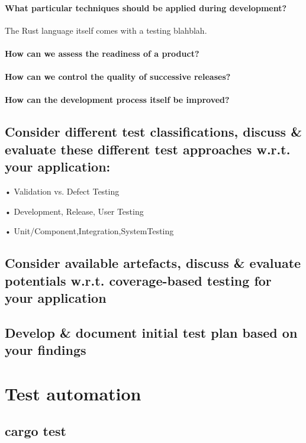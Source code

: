 \documentclass{scrartcl}
\begin{document}
\paragraph{What particular techniques should be applied during development?}
  
  The Rust language itself comes with a testing blahblah.
\paragraph{How can we assess the readiness of a product?} 
\paragraph{How can we control the quality of successive releases?}
\paragraph{How can the development process itself be improved?}
\subsection{Consider different test classifications, discuss \& evaluate these different test approaches w.r.t. your application:}

• Validation vs. Defect Testing

• Development, Release, User Testing

• Unit/Component,Integration,SystemTesting

\subsection{Consider available artefacts, discuss \& evaluate potentials w.r.t. coverage-based testing for your application}

\subsection{Develop \& document initial test plan based on your findings}





\newpage



\section{Test automation}


\subsection{cargo test}
\end{document}
